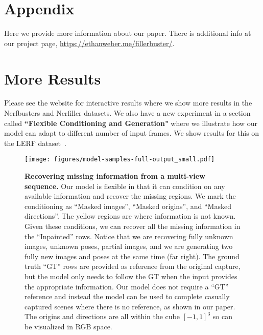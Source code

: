 \clearpage
\appendix
\setcounter{page}{1}
\setcounter{figure}{0}
\renewcommand{\thefigure}{A.\arabic{figure}}
\setcounter{table}{0}
\renewcommand{\thetable}{A.\arabic{table}}
\section{Appendix}
\label{sec:appendix}

Here we provide more information about our paper. There is additional info at our project page, \url{https://ethanweber.me/fillerbuster/}.

\section{More Results}

Please see the website for interactive results where we show more results in the Nerfbusters and Nerfiller datasets. We also have a new experiment in a section called \textbf{``Flexible Conditioning and Generation"} where we illustrate how our model can adapt to different number of input frames. We show results for this on the LERF dataset~\cite{kerr2023lerf}.

\begin{figure*}[t]
\centering
\texttt{[image: figures/model-samples-full-output\_small.pdf]}\vspace{-0.5em}
\caption{\label{fig:model_sample}%
    \textbf{Recovering missing information from a multi-view sequence.}
    Our model is flexible in that it can condition on any available information and recover the missing regions.
    We mark the conditioning as ``Masked images'', ``Masked origins'', and ``Masked directions''.
    The yellow regions are where information is not known.
    Given these conditions, we can recover all the missing information in the ``Inpainted'' rows.
    Notice that we are recovering fully unknown images, unknown poses, partial images, and we are generating two fully new images and poses at the same time (far right).
    The ground truth ``GT'' rows are provided as reference from the original capture, but the model only needs to follow the GT when the input provides the appropriate information. Our model does not require a ``GT'' reference and instead the model can be used to complete casually captured scenes where there is no reference, as shown in our paper.
    The origins and directions are all within the cube $[-1, 1]^3$ so can be visualized in RGB space.
}\vspace{-1em}
\end{figure*}


